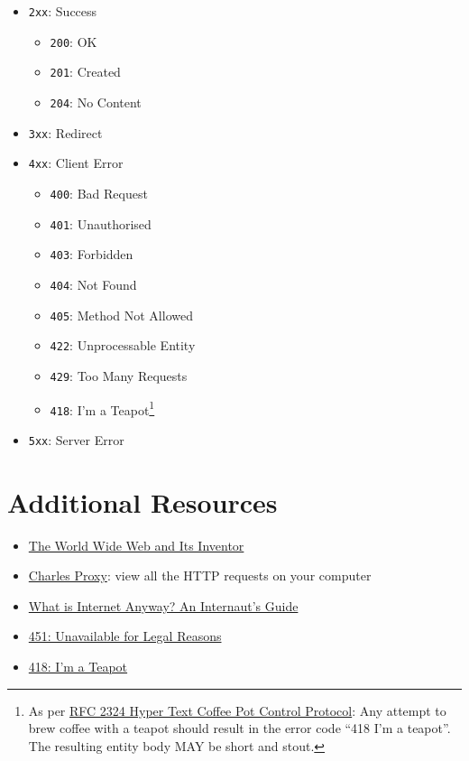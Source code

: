 \begin{itemize}
    \item \texttt{2xx}: Success
        \begin{itemize}
            \item \texttt{200}: OK
            \item \texttt{201}: Created
            \item \texttt{204}: No Content
        \end{itemize}

    \item \texttt{3xx}: Redirect

    \item \texttt{4xx}: Client Error
        \begin{itemize}
            \item \texttt{400}: Bad Request
            \item \texttt{401}: Unauthorised
            \item \texttt{403}: Forbidden
            \item \texttt{404}: Not Found
            \item \texttt{405}: Method Not Allowed
            \item \texttt{422}: Unprocessable Entity
            \item \texttt{429}: Too Many Requests
            \item \texttt{418}: I'm a Teapot\footnote{As per \href{https://tools.ietf.org/html/rfc2324\#section-2.3.2}{RFC 2324 Hyper Text Coffee Pot Control Protocol}: Any attempt to brew coffee with a teapot should result in the error code ``418 I'm a teapot''. The resulting entity body MAY be short and stout.}
        \end{itemize}

    \item \texttt{5xx}: Server Error
\end{itemize}


\section{Additional Resources}

\begin{itemize}[leftmargin=*]
    \item \href{https://twobithistory.org/2018/06/10/birth-of-the-web.html}{The World Wide Web and Its Inventor}
    \item \href{https://www.charlesproxy.com}{Charles Proxy}: view all the HTTP requests on your computer
    \item \href{https://www.youtube.com/watch?v=6iYfvshY4e0}{What is Internet Anyway? An Internaut's Guide}
    \item \href{https://evertpot.com/http/451-unavailable-for-legal-reasons}{451: Unavailable for Legal Reasons}
    \item \href{https://developer.mozilla.org/en-US/docs/Web/HTTP/Status/418}{418: I'm a Teapot}
\end{itemize}
